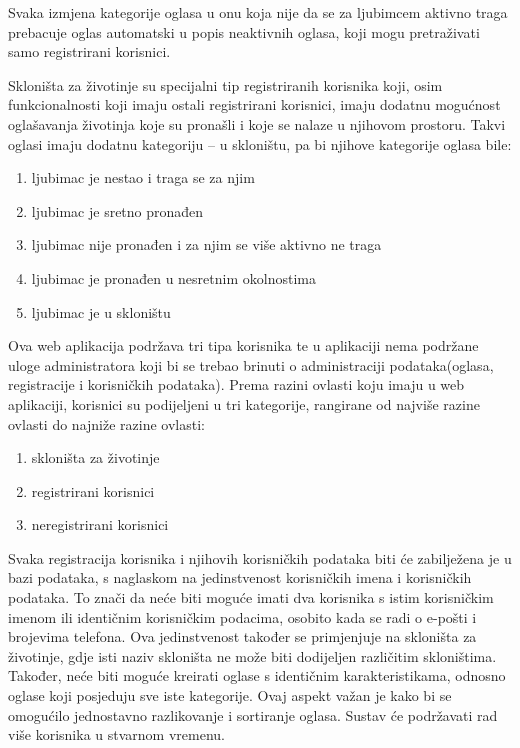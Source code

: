 		Svaka izmjena kategorije oglasa u onu koja nije da se za ljubimcem aktivno traga prebacuje oglas automatski u popis neaktivnih oglasa, koji mogu pretraživati samo registrirani korisnici.
		
		Skloništa za životinje su specijalni tip registriranih korisnika koji, osim funkcionalnosti koji imaju ostali registrirani korisnici, imaju dodatnu mogućnost oglašavanja životinja koje su pronašli i koje se nalaze u njihovom prostoru. Takvi oglasi imaju dodatnu kategoriju – u skloništu, pa bi njihove kategorije oglasa bile:
		
		\begin{enumerate}
			\item ljubimac je nestao i traga se za njim
			\item ljubimac je sretno pronađen
			\item ljubimac nije pronađen i za njim se više aktivno ne traga
			\item ljubimac je pronađen u nesretnim okolnostima
			\item ljubimac je u skloništu
		\end{enumerate}
		
		Ova web aplikacija podržava tri tipa korisnika te u aplikaciji nema podržane uloge administratora koji bi se trebao brinuti o administraciji podataka(oglasa, registracije i korisničkih podataka). Prema razini ovlasti koju imaju u web aplikaciji, korisnici su podijeljeni u tri kategorije, rangirane od najviše razine ovlasti do najniže razine ovlasti:
		
		\begin{enumerate}
			\item skloništa za životinje
			\item registrirani korisnici
			\item neregistrirani korisnici
		\end{enumerate}
		
		Svaka registracija korisnika i njihovih korisničkih podataka biti će zabilježena je u bazi podataka, s naglaskom na jedinstvenost korisničkih imena i korisničkih podataka. To znači da neće biti moguće imati dva korisnika s istim korisničkim imenom ili identičnim korisničkim podacima, osobito kada se radi o e-pošti i brojevima telefona. Ova jedinstvenost također se primjenjuje na skloništa za životinje, gdje isti naziv skloništa ne može biti dodijeljen različitim skloništima. Također, neće biti moguće kreirati oglase s identičnim karakteristikama, odnosno oglase koji posjeduju sve iste kategorije. Ovaj aspekt važan je kako bi se omogućilo jednostavno razlikovanje i sortiranje oglasa. Sustav će podržavati rad više korisnika u stvarnom vremenu.
		
